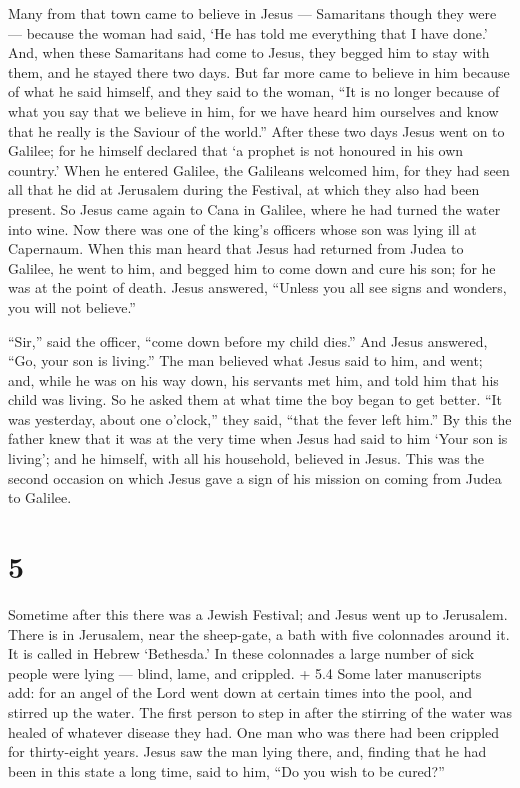 Many from that town came to believe in Jesus ---
Samaritans though they were --- because the woman had said, `He has told
me everything that I have done.'  And, when these
Samaritans had come to Jesus, they begged him to stay with them, and he
stayed there two days.  But far more came to believe in him
because of what he said himself,  and they said to the
woman, ``It is no longer because of what you say that we believe in him,
for we have heard him ourselves and know that he really is the Saviour
of the world.''  After these two days Jesus went on to
Galilee;  for he himself declared that `a prophet is not
honoured in his own country.'  When he entered Galilee, the
Galileans welcomed him, for they had seen all that he did at Jerusalem
during the Festival, at which they also had been present. 
So Jesus came again to Cana in Galilee, where he had turned the water
into wine. Now there was one of the king's officers whose son was lying
ill at Capernaum.  When this man heard that Jesus had
returned from Judea to Galilee, he went to him, and begged him to come
down and cure his son; for he was at the point of death. 
Jesus answered, ``Unless you all see signs and wonders, you will not
believe.''

 ``Sir,'' said the officer, ``come down before my child
dies.'' And Jesus answered, ``Go, your son is living.'' 
The man believed what Jesus said to him, and went;  and,
while he was on his way down, his servants met him, and told him that
his child was living.  So he asked them at what time the
boy began to get better. ``It was yesterday, about one o'clock,'' they
said, ``that the fever left him.''  By this the father knew
that it was at the very time when Jesus had said to him `Your son is
living'; and he himself, with all his household, believed in Jesus.
 This was the second occasion on which Jesus gave a sign of
his mission on coming from Judea to Galilee.

\hypertarget{section-4}{%
\section{5}\label{section-4}}

 Sometime after this there was a Jewish Festival; and Jesus
went up to Jerusalem.  There is in Jerusalem, near the
sheep-gate, a bath with five colonnades around it. It is called in
Hebrew `Bethesda.'  In these colonnades a large number of
sick people were lying --- blind, lame, and crippled.  + 5.4
Some later manuscripts add: for an angel of the Lord went down at
certain times into the pool, and stirred up the water. The first person
to step in after the stirring of the water was healed of whatever
disease they had.  One man who was there had been crippled
for thirty-eight years.  Jesus saw the man lying there, and,
finding that he had been in this state a long time, said to him, ``Do
you wish to be cured?''

